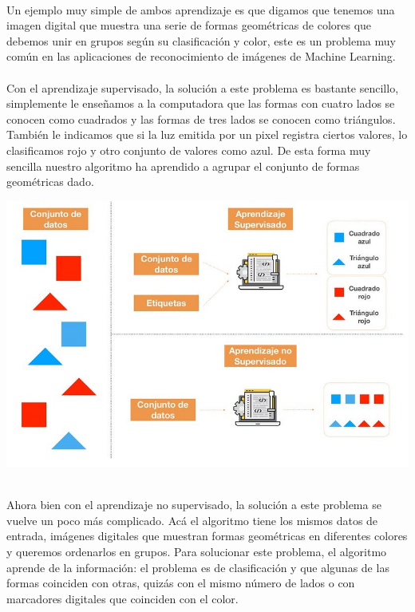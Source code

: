 \documentclass[11pt,a4paper]{article}
\begin{document}
		\\Un ejemplo muy simple de ambos aprendizaje es que digamos que tenemos una imagen digital que muestra una serie de formas geométricas de colores que debemos unir en grupos según su clasificación y color, este es un problema muy común en las aplicaciones de reconocimiento de imágenes de Machine Learning.\\

        \\Con el aprendizaje supervisado, la solución a este problema es bastante sencillo, simplemente le enseñamos a la computadora que las formas con cuatro lados se conocen como cuadrados  y las formas de tres lados se conocen como triángulos. También le indicamos que si la luz emitida por un pixel registra ciertos valores, lo clasificamos rojo y otro conjunto de valores como azul. De esta forma muy sencilla nuestro algoritmo ha aprendido a agrupar el conjunto de formas geométricas dado.\\
		
		\begin{center}
		\includegraphics[scale=1.0]{./Imagenes/EjemploAprendizajeNoSupervisado}
		\end{center}
		
		\\Ahora bien con el aprendizaje no supervisado, la solución a este problema se vuelve un poco más complicado. Acá el algoritmo tiene los mismos datos de entrada, imágenes digitales que muestran formas geométricas en diferentes colores y queremos ordenarlos en grupos. Para solucionar este problema, el algoritmo aprende de la información: el problema es de clasificación y que algunas de las formas coinciden con otras, quizás con el mismo número de lados o con marcadores digitales que coinciden con el color.\\
		
\end{document}
